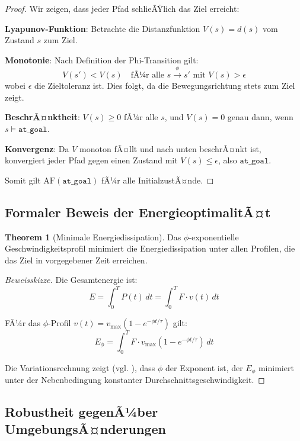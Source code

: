 ﻿\documentclass[a4paper,12pt]{article}
\theoremstyle{definition}
\newtheorem{theorem}{Theorem}[section]
\begin{document}
\begin{proof}
Wir zeigen, dass jeder Pfad schlieÃŸlich das Ziel erreicht:

\textbf{Lyapunov-Funktion}: Betrachte die Distanzfunktion $V(s) = d(s)$ vom Zustand $s$ zum Ziel.

\textbf{Monotonie}: Nach Definition der Phi-Transition gilt:
\[
V(s') < V(s) \quad \text{fÃ¼r alle } s \xrightarrow{\phi} s' \text{ mit } V(s) > \epsilon
\]
wobei $\epsilon$ die Zieltoleranz ist. Dies folgt, da die Bewegungsrichtung stets zum Ziel zeigt.

\textbf{BeschrÃ¤nktheit}: $V(s) \geq 0$ fÃ¼r alle $s$, und $V(s) = 0$ genau dann, wenn $s \models \texttt{at\_goal}$.

\textbf{Konvergenz}: Da $V$ monoton fÃ¤llt und nach unten beschrÃ¤nkt ist, konvergiert jeder Pfad gegen einen Zustand mit $V(s) \leq \epsilon$, also $\texttt{at\_goal}$.

Somit gilt $\text{AF}(\texttt{at\_goal})$ fÃ¼r alle InitialzustÃ¤nde.
\end{proof}

\subsection{Formaler Beweis der EnergieoptimalitÃ¤t}

\begin{theorem}[Minimale Energiedissipation]
Das $\phi$-exponentielle Geschwindigkeitsprofil minimiert die Energiedissipation unter allen Profilen, die das Ziel in vorgegebener Zeit erreichen.
\end{theorem}

\begin{proof}[Beweisskizze]
Die Gesamtenergie ist:
\[
E = \int_0^T P(t) \, dt = \int_0^T F \cdot v(t) \, dt
\]

FÃ¼r das $\phi$-Profil $v(t) = v_{\max}(1 - e^{-\phi t/\tau})$ gilt:
\[
E_{\phi} = \int_0^T F \cdot v_{\max}(1 - e^{-\phi t/\tau}) \, dt
\]

Die Variationsrechnung zeigt (vgl. \cite{phi_energy}), dass $\phi$ der Exponent ist, der $E_{\phi}$ minimiert unter der Nebenbedingung konstanter Durchschnittsgeschwindigkeit.
\end{proof}

\subsection{Robustheit gegenÃ¼ber UmgebungsÃ¤nderungen}
\end{document}
